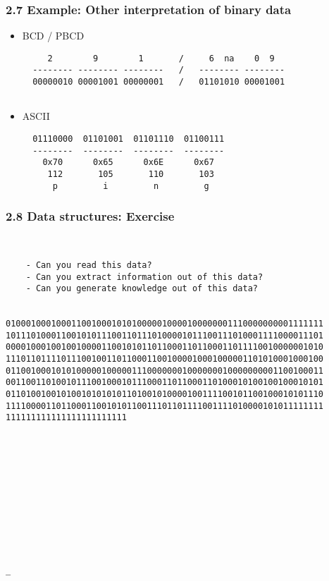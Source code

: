 \begin{frame}[fragile]
  \frametitle{2.7 Example: Other interpretation of binary data}
  \begin{itemize}
    \item[] BCD / PBCD
  \begin{verbatim}
     2        9        1       /     6  na    0  9
  -------- -------- --------   /   -------- -------- 
  00000010 00001001 00000001   /   01101010 00001001
                             
  \end{verbatim}
    \item[] ASCII
  \begin{verbatim}
  01110000  01101001  01101110  01100111
  --------  --------  --------  --------
    0x70      0x65      0x6E      0x67
     112       105       110       103
      p         i         n         g
  \end{verbatim}
  \end{itemize}
\end{frame}


\begin{frame}[fragile]
  \frametitle{2.8 Data structures: Exercise}
\begin{lstlisting}[basicstyle=\tiny]


	- Can you read this data?
	- Can you extract information out of this data?
	- Can you generate knowledge out of this data?


010001000100011001000101010000010000100000001110000000001111111
101110100011001010111001101110100001011100111010001111000011101
000010001001001000011001010110110001101100011011110010000001010
111011011110111001001101100011001000010001000001101010001000100
011001000101010000010000011100000001000000010000000001100100011
001100110100101110010001011100011011000110100010100100100010101
011010010010100101010101101001010000100111100101100100010101110
111100001101100011001010110011101101111001111010000101011111111
111111111111111111111111












_  
\end{lstlisting}
\end{frame}



